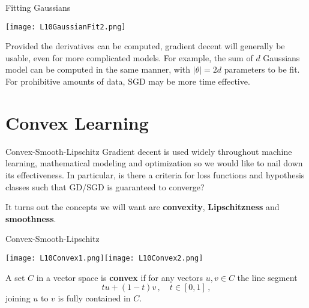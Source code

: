 \documentclass[10pt, table, dvipsnames,xcdraw, handout]{beamer}
\begin{document}
\begin{frame}[fragile]{Fitting Gaussians}
  \begin{minipage}[t][0.5\textheight][t]{\textwidth}
	\centering \texttt{[image: L10GaussianFit2.png]}
  \end{minipage}
  \vfill
\begin{minipage}[t][0.5\textheight][t]{\textwidth}
Provided the derivatives can be computed, gradient decent will generally be usable, even for more complicated models. For example, the sum of $d$ Gaussians model can be computed in the same manner, with $|\theta| = 2d$ parameters to be fit. For prohibitive amounts of data, SGD may be more time effective. 
\end{minipage}
\end{frame}





\section{Convex Learning}

\begin{frame}[fragile]{Convex-Smooth-Lipschitz}
Gradient decent is used widely throughout machine learning, mathematical modeling and optimization so we would like to nail down its effectiveness. In particular, is there a criteria for loss functions and hypothesis classes such that GD/SGD is guaranteed to converge?\pause

It turns out the concepts we will want are \textbf{convexity}, \textbf{Lipschitzness} and \textbf{smoothness}.

\end{frame}


\begin{frame}[fragile]{Convex-Smooth-Lipschitz}
  \begin{minipage}[t][0.5\textheight][t]{\textwidth}
	\centering \texttt{[image: L10Convex1.png]}\texttt{[image: L10Convex2.png]} 
  \end{minipage}
  \vfill
\begin{minipage}[t][0.5\textheight][t]{\textwidth}
A set $C$ in a vector space is \textbf{convex} if for any vectors $u,v\in C$ the line segment 
$$
tu+(1-t)v\,,\hspace{1em} t\in [0,1]\,,
$$ 
joining $u$ to $v$ is fully contained in $C$. 
\end{minipage}
\end{frame}
\end{document}
